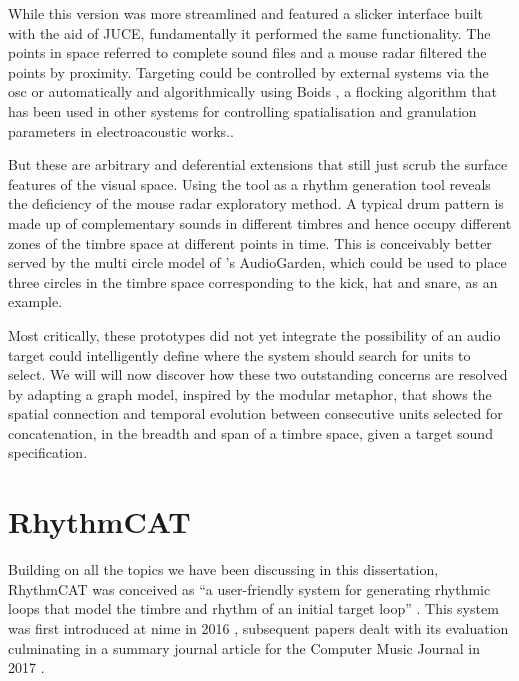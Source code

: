 While this version was more streamlined and featured a slicker interface built with the aid of JUCE, fundamentally it performed the same functionality. The points in space referred to complete sound files and a mouse radar filtered the points by proximity. Targeting could be controlled by external systems via the \acrshort{osc} or automatically and algorithmically using Boids \citep{Reynolds1987}, a flocking algorithm that has been used in other systems for controlling spatialisation and granulation parameters in electroacoustic works.\citep{Kim-Boyle2006, Wilson2008, Barreiro2010}. 

But these are arbitrary and deferential extensions that still just scrub the surface features of  the visual space. Using the tool as a rhythm generation tool reveals the deficiency of the mouse radar exploratory method. A typical drum pattern is made up of complementary sounds in different timbres and hence occupy different zones of the timbre space at different points in time. This is conceivably better served by the multi circle model of \citep{Frisson2010}'s AudioGarden, which could be used to place three circles in the timbre space corresponding to the kick, hat and snare, as an example.

Most critically, these prototypes did not yet integrate the possibility of an audio target could  intelligently define where the system should search for units to select. We will will now discover how these two outstanding concerns are resolved by adapting a graph model, inspired by the modular metaphor, that shows the spatial connection and temporal evolution between consecutive units selected for concatenation, in the breadth and span of a timbre space, given a target sound specification.

\section{RhythmCAT}

Building on all the topics we have been discussing in this dissertation, RhythmCAT was conceived as ``a user-friendly system for generating rhythmic loops that model the timbre and rhythm of an initial target loop'' \citep{Nuanain2017b}. This system was first introduced at \acrfull{nime} in 2016 \citep{Nuanain2016a}, subsequent papers dealt with its evaluation \citep{Nuanain2016b, Nuanain2016c} culminating in a summary journal article for the Computer Music Journal in 2017 \citep{Nuanain2017b}.

%
%
%

